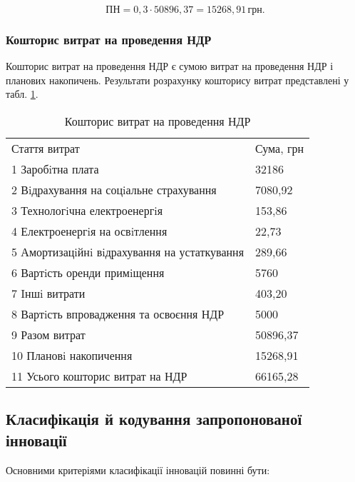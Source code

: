 \[
\text{ПН} = 0,3 \cdot 50896,37 = 15268,91 \, \text{грн}.
\]

\vspace{1.5em}

\subsubsection{Кошторис витрат на проведення НДР}

Кошторис витрат на проведення НДР є сумою витрат на проведення НДР і планових накопичень. Результати розрахунку кошторису витрат представлені у табл. \ref{tab:sumNDR}.

\newpage

\vspace{-1.5em}

\begin{table}[hbt]
	\captionstyle{ \raggedright}
	\caption{Кошторис витрат на проведення НДР}\label{tab:sumNDR}
	\begin{tabular}{|p{}|p{}|}
		\hline
		Стаття витрат & Сума, грн \\
		\hlinewd{2pt}
		1 Заробiтна плата & 32186  \\
		\hline
		2 Вiдрахування на соцiальне страхування & 7080,92 \\
		\hline
		3 Технологiчна електроенергiя & 153,86 \\
		\hline
		4 Електроенергiя на освiтлення & 22,73 \\
		\hline
		5 Амортизацiйнi вiдрахування на устаткування & 289,66 \\
		\hline
		6 Вартiсть оренди примiщення & 5760 \\
		\hline
		7 Iншi витрати & 403,20 \\
		\hline
		8 Вартiсть впровадження та освоєння НДР & 5000 \\
		\hline
		9 Разом витрат & 50896,37 \\
		\hline
		10 Плановi накопичення & 15268,91 \\
		\hline
		11 Усього кошторис витрат на НДР & 66165,28  \\
		\hline
	\end{tabular}
\end{table}

\subsection{Класифікація й кодування запропонованої інновації}

Основними критеріями класифікації інновацій повинні бути:


